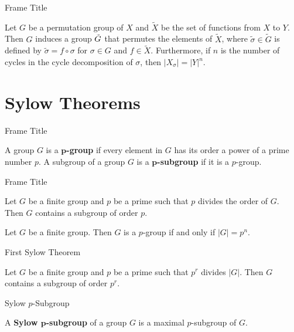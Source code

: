 \documentclass{beamer}
\begin{document}
\begin{frame}{Frame Title}
    \begin{theorem}
        \justifying
        Let $G$ be a permutation group of $X$ and $\tilde{X}$ be the set of functions from $X$ to $Y$. Then $G$ induces a group $\Tilde{G}$ that permutes the elements of $\tilde{X}$, where $\tilde{\sigma} \in \tilde{G}$ is defined by $\tilde{\sigma} = f \circ \sigma$ for $\sigma \in G$ and $f \in \tilde{X}$. Furthermore, if $n$ is the number of cycles in the cycle decomposition of $\sigma$, then $|X_{\sigma}| = |Y|^n$.
    \end{theorem}
\end{frame}

\section{Sylow Theorems}

\begin{frame}{Frame Title}
    \begin{definition}
        \justifying
        A group $G$ is a \textbf{$\boldsymbol{p}$-group} if every element in $G$ has its order a power of a prime number $p$. A subgroup of a group $G$ is a \textbf{$\boldsymbol{p}$-subgroup} if it is a $p$-group.
    \end{definition}
\end{frame}

\begin{frame}{Frame Title}
    \begin{theorem}
        \justifying
        Let $G$ be a finite group and $p$ be a prime such that $p$ divides the order of $G$. Then $G$ contains a subgroup of order $p$.
    \end{theorem}
    \pause
    \begin{corollary}
        \justifying
        Let $G$ be a finite group. Then $G$ is a $p$-group if and only if $|G| = p^n$.
    \end{corollary}
\end{frame}

\begin{frame}{First Sylow Theorem}
    \begin{theorem}
        \justifying
        Let $G$ be a finite group and $p$ be a prime such that $p^r$ divides $|G|$. Then $G$ contains a subgroup of order $p^r$.
    \end{theorem}
\end{frame}

\begin{frame}{Sylow $p$-Subgroup}
    \begin{definition}
        \justifying
        A \textbf{Sylow $\boldsymbol{p}$-subgroup} of a group $G$ is a maximal $p$-subgroup of $G$.
    \end{definition}
\end{frame}
\end{document}
